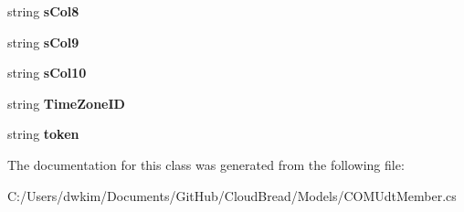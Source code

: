 \begin{DoxyCompactItemize}
\item 
string {\bfseries s\+Col8}\hypertarget{a00071_a8a92cdb147cd62630709703a3b173338}{}\label{a00071_a8a92cdb147cd62630709703a3b173338}

\item 
string {\bfseries s\+Col9}\hypertarget{a00071_aa4074ea1d85e947bfbe2209cd39c9274}{}\label{a00071_aa4074ea1d85e947bfbe2209cd39c9274}

\item 
string {\bfseries s\+Col10}\hypertarget{a00071_a038fe43d47776b0906f89dc2a1867863}{}\label{a00071_a038fe43d47776b0906f89dc2a1867863}

\item 
string {\bfseries Time\+Zone\+ID}\hypertarget{a00071_a6a4cfcd19b95d72c1f1c2940090637a2}{}\label{a00071_a6a4cfcd19b95d72c1f1c2940090637a2}

\item 
string {\bfseries token}\hypertarget{a00071_ad7e630a2c5233c2ec4c59146139209cb}{}\label{a00071_ad7e630a2c5233c2ec4c59146139209cb}

\end{DoxyCompactItemize}


The documentation for this class was generated from the following file\+:\begin{DoxyCompactItemize}
\item 
C\+:/\+Users/dwkim/\+Documents/\+Git\+Hub/\+Cloud\+Bread/\+Models/C\+O\+M\+Udt\+Member.\+cs\end{DoxyCompactItemize}
